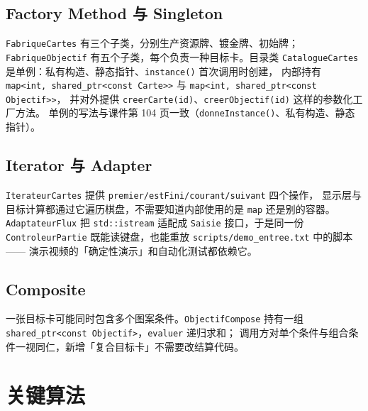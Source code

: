 \documentclass[11pt,a4paper]{ctexart}
\newcommand{\cl}[1]{\texttt{#1}}
\begin{document}
\subsection{Factory Method 与 Singleton}
\cl{FabriqueCartes} 有三个子类，分别生产资源牌、镀金牌、初始牌；
\cl{FabriqueObjectif} 有五个子类，每个负责一种目标卡。目录类
\cl{CatalogueCartes} 是单例：私有构造、静态指针、\cl{instance()} 首次调用时创建，
内部持有 \cl{map<int, shared\_ptr<const Carte>>} 与 \cl{map<int, shared\_ptr<const Objectif>>}，
并对外提供 \cl{creerCarte(id)}、\cl{creerObjectif(id)} 这样的参数化工厂方法。
单例的写法与课件第 104 页一致（\cl{donneInstance()}、私有构造、静态指针）。

\subsection{Iterator 与 Adapter}
\cl{IterateurCartes} 提供 \cl{premier/estFini/courant/suivant} 四个操作，
显示层与目标计算都通过它遍历棋盘，不需要知道内部使用的是 \cl{map} 还是别的容器。
\cl{AdaptateurFlux} 把 \cl{std::istream} 适配成 \cl{Saisie} 接口，于是同一份
\cl{ControleurPartie} 既能读键盘，也能重放 \cl{scripts/demo\_entree.txt} 中的脚本——
演示视频的「确定性演示」和自动化测试都依赖它。

\subsection{Composite}
一张目标卡可能同时包含多个图案条件。\cl{ObjectifCompose} 持有一组
\cl{shared\_ptr<const Objectif>}，\cl{evaluer} 递归求和；
调用方对单个条件与组合条件一视同仁，新增「复合目标卡」不需要改结算代码。

\section{关键算法}
\end{document}
